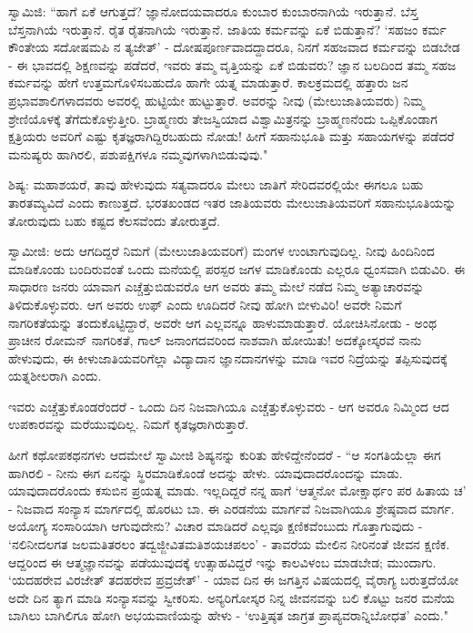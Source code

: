 ಸ್ವಾಮಿಜಿ: “ಹಾಗೆ ಏಕೆ ಆಗುತ್ತದೆ? ಜ್ಞಾನೋದಯವಾದರೂ ಕುಂಬಾರ ಕುಂಬಾರನಾಗಿಯೆ ಇರುತ್ತಾನೆ. ಬೆಸ್ತ ಬೆಸ್ತನಾಗಿಯೆ ಇರುತ್ತಾನೆ. ರೈತ ರೈತನಾಗಿಯೆ ಇರುತ್ತಾನೆ. ಜಾತಿಯ ಕರ್ಮವನ್ನು ಏಕೆ ಬಿಡುತ್ತಾನೆ? ‘ಸಹಜಂ ಕರ್ಮ ಕೌಂತೇಯ ಸದೋಷಮಪಿ ನ ತ್ಯಜೇತ್’ - ದೋಷಪೂರ್ಣವಾದದ್ದಾದರೂ, ನಿನಗೆ ಸಹಜವಾದ ಕರ್ಮವನ್ನು ಬಿಡಬೇಡ - ಈ ಭಾವದಲ್ಲಿ ಶಿಕ್ಷಣವನ್ನು ಪಡೆದರೆ, ಇವರು ತಮ್ಮ ವೃತ್ತಿಯನ್ನು ಏಕೆ ಬಿಡುವರು? ಜ್ಞಾನ ಬಲದಿಂದ ತಮ್ಮ ಸಹಜ ಕರ್ಮವನ್ನು ಹೇಗೆ ಉತ್ತಮಗೊಳಿಸಬಹುದೊ ಹಾಗೇ ಯತ್ನ ಮಾಡುತ್ತಾರೆ. ಕಾಲಕ್ರಮದಲ್ಲಿ ಹತ್ತಾರು ಜನ ಪ್ರಭಾವಶಾಲಿಗಳಾದವರು ಅವರಲ್ಲಿ ಹುಟ್ಟಿಯೇ ಹುಟ್ಟುತ್ತಾರೆ. ಅವರನ್ನು ನೀವು (ಮೇಲುಜಾತಿಯವರು) ನಿಮ್ಮ ಶ್ರೇಣಿಯೊಳಕ್ಕೆ ತೆಗೆದುಕೊಳ್ಳುತ್ತೀರಿ. ಬ್ರಾಹ್ಮಣರು ತೇಜಸ್ವಿಯಾದ ವಿಶ್ವಾಮಿತ್ರನನ್ನು ಬ್ರಾಹ್ಮಣನೆಂದು ಒಪ್ಪಿಕೊಂಡಾಗ ಕ್ಷತ್ರಿಯರು ಅವರಿಗೆ ಎಷ್ಟು ಕೃತಜ್ಞರಾಗಿದ್ದಿರಬಹುದು ನೋಡು! ಹೀಗೆ ಸಹಾನುಭೂತಿ ಮತ್ತು ಸಹಾಯಗಳನ್ನು ಪಡೆದರೆ ಮನುಷ್ಯರು ಹಾಗಿರಲಿ, ಪಶುಪಕ್ಷಿಗಳೂ ನಮ್ಮವುಗಳಾಗಿಬಿಡುವುವು."

ಶಿಷ್ಯ: ಮಹಾಶಯರೆ, ತಾವು ಹೇಳುವುದು ಸತ್ಯವಾದರೂ ಮೇಲು ಜಾತಿಗೆ ಸೇರಿದವರಲ್ಲಿಯೇ ಈಗಲೂ ಬಹು ತಾರತಮ್ಯವಿದೆ ಎಂದು ಕಾಣುತ್ತದೆ. ಭರತಖಂಡದ ಇತರ ಜಾತಿಯವರು ಮೇಲುಜಾತಿಯವರಿಗೆ ಸಹಾನುಭೂತಿಯನ್ನು ತೋರುವುದು ಬಹು ಕಷ್ಟದ ಕೆಲಸವೆಂದು ತೋರುತ್ತದೆ.

ಸ್ವಾಮೀಜಿ: ಅದು ಆಗದಿದ್ದರೆ ನಿಮಗೆ (ಮೇಲುಜಾತಿಯವರಿಗೆ) ಮಂಗಳ ಉಂಟಾಗುವುದಿಲ್ಲ. ನೀವು ಹಿಂದಿನಿಂದ ಮಾಡಿಕೊಂಡು ಬಂದಿರುವಂತೆ ಒಂದು ಮನೆಯಲ್ಲಿ ಪರಸ್ಪರ ಜಗಳ ಮಾಡಿಕೊಂಡು ಎಲ್ಲರೂ ಧ್ವಂಸವಾಗಿ ಬಿಡುವಿರಿ. ಈ ಸಾಧಾರಣ ಜನರು ಯಾವಾಗ ಎಚ್ಚೆತ್ತುಬಿಡುವರೊ ಆಗ ಅವರು ತಮ್ಮ ಮೇಲೆ ನಡೆದ ನಿಮ್ಮ ಅತ್ಯಾಚಾರವನ್ನು ತಿಳಿದುಕೊಳ್ಳುವರು. ಆಗ ಅವರು ಉಫ್ ಎಂದು ಊದಿದರೆ ನೀವು ಹೋಗಿ ಬೀಳುವಿರಿ! ಅವರೇ ನಿಮಗೆ ನಾಗರಿಕತೆಯನ್ನು ತಂದುಕೊಟ್ಟಿದ್ದಾರೆ, ಅವರೇ ಆಗ ಎಲ್ಲವನ್ನೂ ಹಾಳುಮಾಡುತ್ತಾರೆ. ಯೋಚಿಸಿನೋಡು - ಅಂಥ ಪ್ರಾಚೀನ ರೋಮನ್ ನಾಗರಿಕತೆ, ಗಾಲ್ ಜನಾಂಗದವರಿಂದ ನಾಶವಾಗಿ ಹೋಯಿತು! ಅದಕ್ಕೋಸ್ಕರವೆ ನಾನು ಹೇಳುವುದು, ಈ ಕೀಳುಜಾತಿಯವರಿಗೆಲ್ಲಾ ವಿದ್ಯಾದಾನ ಜ್ಞಾನದಾನಗಳನ್ನು ಮಾಡಿ ಇವರ ನಿದ್ರೆಯನ್ನು ತಪ್ಪಿಸುವುದಕ್ಕೆ ಯತ್ನಶೀಲರಾಗಿ ಎಂದು.

ಇವರು ಎಚ್ಚೆತ್ತುಕೊಂಡರೆಂದರೆ - ಒಂದು ದಿನ ನಿಜವಾಗಿಯೂ ಎಚ್ಚೆತ್ತುಕೊಳ್ಳುವರು - ಆಗ ಅವರೂ ನಿಮ್ಮಿಂದ ಆದ ಉಪಕಾರವನ್ನು ಮರೆಯುವುದಿಲ್ಲ. ನಿಮಗೆ ಕೃತಜ್ಞರಾಗಿರುತ್ತಾರೆ.

ಹೀಗೆ ಕಥೋಪಕಥನಗಳು ಆದಮೇಲೆ ಸ್ವಾಮೀಜಿ ಶಿಷ್ಯನನ್ನು ಕುರಿತು ಹೇಳಿದ್ದೇನೆಂದರೆ - “ಆ ಸಂಗತಿಯೆಲ್ಲಾ ಈಗ ಹಾಗಿರಲಿ - ನೀನು ಈಗ ಏನನ್ನು ಸ್ಥಿರಮಾಡಿಕೊಂಡೆ ಅದನ್ನು ಹೇಳು. ಯಾವುದಾದರೊಂದನ್ನು ಮಾಡು. ಯಾವುದಾದರೊಂದು ಕಸುಬಿನ ಪ್ರಯತ್ನ ಮಾಡು. ಇಲ್ಲದಿದ್ದರೆ ನನ್ನ ಹಾಗೆ ‘ಆತ್ಮನೋ ಮೋಕ್ಷಾರ್ಥಂ ಪರ ಹಿತಾಯ ಚ’ - ನಿಜವಾದ ಸಂನ್ಯಾಸ ಮಾರ್ಗದಲ್ಲಿ ಹೊರಟು ಬಾ. ಈ ಎರಡನೆಯ ಮಾರ್ಗವೆ ನಿಜವಾಗಿಯೂ ಶ್ರೇಷ್ಠವಾದ ಮಾರ್ಗ. ಅಯೋಗ್ಯ ಸಂಸಾರಿಯಾಗಿ ಆಗುವುದೇನು? ವಿಚಾರ ಮಾಡಿದರೆ ಎಲ್ಲವೂ ಕ್ಷಣಿಕವೆಂಬುದು ಗೊತ್ತಾಗುವುದು - ‘ನಲಿನೀದಲಗತ ಜಲಮತಿತರಲಂ ತದ್ವಜ್ಜೀವಿತಮತಿಶಯಚಪಲಂ’ - ತಾವರೆಯ ಮೇಲಿನ ನೀರಿನಂತೆ ಜೀವನ ಕ್ಷಣಿಕ. ಆದ್ದರಿಂದ ಈ ಆತ್ಮಜ್ಞಾನವನ್ನು ಪಡೆಯುವುದಕ್ಕೆ ಉತ್ಸಾಹವಿದ್ದರೆ ಇನ್ನು ಕಾಲವಿಳಂಬ ಮಾಡಬೇಡ; ಮುಂದಾಗು. ‘ಯದಹರೇವ ವಿರಜೇತ್ ತದಹರೇವ ಪ್ರವ್ರಜೇತ್’ - ಯಾವ ದಿನ ಈ ಜಗತ್ತಿನ ವಿಷಯದಲ್ಲಿ ವೈರಾಗ್ಯ ಬರುತ್ತದೆಯೋ ಅದೇ ದಿನ ತ್ಯಾಗ ಮಾಡಿ ಸಂನ್ಯಾಸವನ್ನು ಸ್ವೀಕರಿಸು. ಅನ್ಯರಿಗೋಸ್ಕರ ನಿನ್ನ ಜೀವನವನ್ನು ಬಲಿ ಕೊಟ್ಟು ಜನರ ಮನೆಯ ಬಾಗಿಲು ಬಾಗಿಲಿಗೂ ಹೋಗಿ ಅಭಯವಾಣಿಯನ್ನು ಹೇಳು - ‘ಉತ್ತಿಷ್ಠತ ಜಾಗ್ರತ ಪ್ರಾಪ್ಯವರಾನ್ನಿಬೋಧತ’ ಎಂದು."

